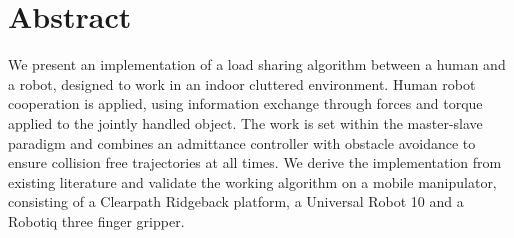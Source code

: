 \chapter*{Abstract}

We present an implementation of a load sharing algorithm between a human and a robot, designed to work in an indoor cluttered environment. Human robot cooperation is applied, using information exchange through forces and torque applied to the jointly handled object. The work is set within the master-slave paradigm and combines an admittance controller with obstacle avoidance to ensure collision free trajectories at all times. We derive the implementation from existing literature and validate the working algorithm on a mobile manipulator, consisting of a Clearpath Ridgeback platform, a Universal Robot 10 and a Robotiq three finger gripper.